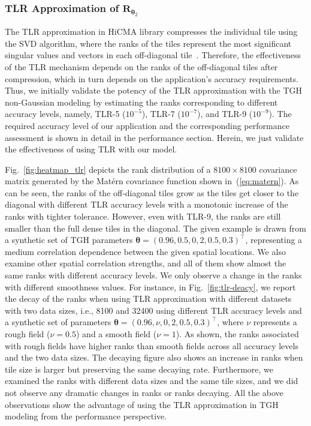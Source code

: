 \documentclass[conference]{IEEEtran}
\begin{document}
\subsubsection{TLR Approximation of $\bm{R}_{\bm{\theta}_2}$}
The TLR approximation in HiCMA library compresses
the individual tile using
the SVD algorithm, where the ranks of the tiles represent
the most significant singular values and vectors in each off-diagonal tile~\cite{akbudak2017tile}. Therefore, the effectiveness of the TLR
mechanism depends on the ranks of the off-diagonal tiles
after compression, which in turn depends on the application's
accuracy requirements. Thus, we initially validate the potency 
of the TLR approximation with the TGH non-Gaussian modeling
by estimating the ranks corresponding to different accuracy levels, namely, TLR-5 ($10^{-5}$), TLR-7 ($10^{-7}$), and TLR-9 ($10^{-9}$). 
The required accuracy level of our application and the corresponding performance assessment is shown in detail in the performance
section. Herein, we just validate the effectiveness of using TLR
with our model.

Fig.~\ref{fig:heatmap_tlr} depicts the rank distribution
of a $8100 \times 8100$ covariance matrix generated by the
Mat\'ern covariance function shown in~(\ref{eq:matern}).  
As can be seen, the ranks of the off-diagonal tiles grow as the
tiles get closer to the diagonal with different TLR accuracy
levels with a monotonic increase of the ranks with tighter tolerance.
However, even with TLR-9, the ranks are still smaller than the
full dense tiles in the diagonal. The given example is drawn
from a synthetic set of TGH parameters $\bm{\theta} = (0.96, 0.5, 0, 2, 0.5, 0.3)^\top$, representing a medium correlation dependence between
the given spatial locations. We also examine other spatial
correlation strengths, and all of them show almost the same
ranks with different accuracy levels. We only observe a change
in the ranks with different smoothness values. 
For instance, in Fig.~\ref{fig:tlr-deacy}, we  report the 
decay of the ranks when using TLR approximation with 
different datasets with two data sizes, i.e., 8100 and 32400 using
different TLR accuracy levels and
a synthetic set of parameters $\bm{\theta} = (0.96, \nu, 0, 2, 0.5, 0.3)^\top$, 
where $\nu$ represents a rough field ($\nu=0.5$) and a smooth field ($\nu=1$). As shown, the ranks associated with rough fields have higher
ranks than smooth fields across all accuracy levels and the
two data sizes. The decaying figure also shows an increase in 
ranks when tile size is larger but preserving the same decaying
rate. Furthermore, we examined the ranks with different data
sizes and the same tile sizes, and we did not observe
any dramatic changes in ranks or ranks decaying. All the above observations show the advantage of using the TLR approximation
 in TGH modeling from the performance perspective.
\end{document}
